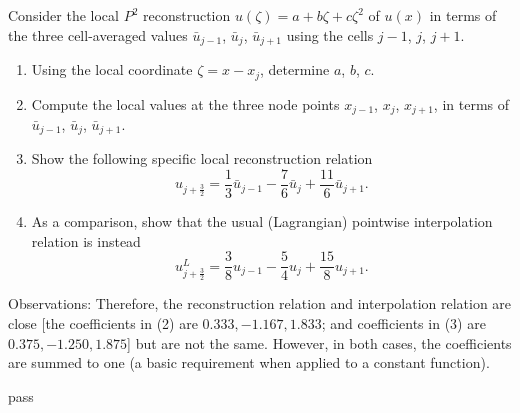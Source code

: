 \begin{homework}[label={H:6-3}]
    Consider the local $P^2$ reconstruction $u(\zeta)=a+b\zeta+c\zeta^2$ of $u(x)$ in terms of the three cell-averaged values $\bar{u}_{j-1}$, $\bar{u}_j$, $\bar{u}_{j+1}$ using the cells $j-1$, $j$, $j+1$.

    \begin{enumerate}[label=(\alph*)]
        \item Using the local coordinate $\zeta=x-x_j$, determine $a$, $b$, $c$.
        \item Compute the local values at the three node points $x_{j-1}$, $x_j$, $x_{j+1}$, in terms of $\bar{u}_{j-1}$, $\bar{u}_j$, $\bar{u}_{j+1}$.
        \item Show the following specific local reconstruction relation
            \begin{equation}\label{E:6-3-1}
                u_{j+\frac{3}{2}} = \frac{1}{3}\bar{u}_{j-1} - \frac{7}{6}\bar{u}_j + \frac{11}{6}\bar{u}_{j+1}.
            \end{equation}
        \item As a comparison, show that the usual (Lagrangian) pointwise interpolation relation is instead
            \begin{equation}\label{E:6-3-2}
                u^L_{j+\frac{3}{2}} = \frac{3}{8}u_{j-1} - \frac{5}{4}u_j + \frac{15}{8}u_{j+1}.
            \end{equation}
    \end{enumerate}

    Observations: Therefore, the reconstruction relation and interpolation relation are close [the coefficients in (2) are $0.333, −1.167, 1.833$; and coefficients in (3) are $0.375, −1.250, 1.875$] but are not the same. However, in both cases, the coefficients are summed to one (a basic requirement when applied to a constant function).
\end{homework}

pass
